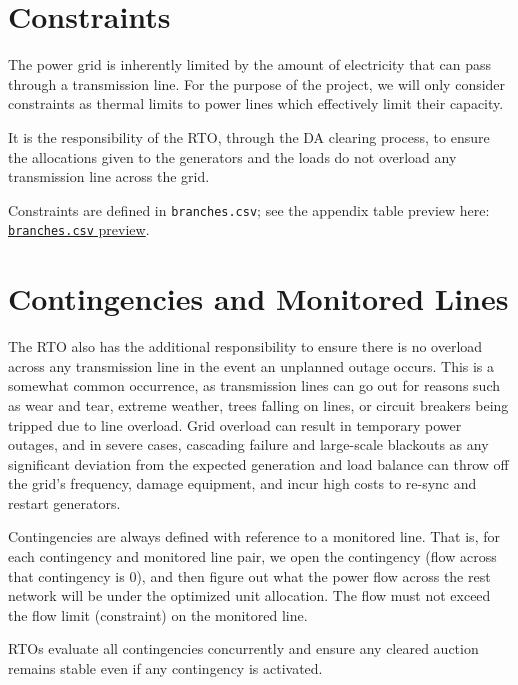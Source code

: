 \documentclass[11pt]{article}
\begin{document}
\section{Constraints}
The power grid is inherently limited by the amount of electricity that can pass through a transmission line. For the purpose of the project, we will only consider constraints as thermal limits to power lines which effectively limit their capacity.

It is the responsibility of the RTO, through the DA clearing process, to ensure the allocations given to the generators and the loads do not overload any transmission line across the grid.

Constraints are defined in \texttt{branches.csv}; see the appendix table preview here: \hyperref[app:branches-preview]{\texttt{branches.csv} preview}.

\section{Contingencies and Monitored Lines}
The RTO also has the additional responsibility to ensure there is no overload across any transmission line in the event an unplanned outage occurs. This is a somewhat common occurrence, as transmission lines can go out for reasons such as wear and tear, extreme weather, trees falling on lines, or circuit breakers being tripped due to line overload. Grid overload can result in temporary power outages, and in severe cases, cascading failure and large-scale blackouts as any significant deviation from the expected generation and load balance can throw off the grid's frequency, damage equipment, and incur high costs to re-sync and restart generators.

Contingencies are always defined with reference to a monitored line. That is, for each contingency and monitored line pair, we open the contingency (flow across that contingency is 0), and then figure out what the power flow across the rest network will be under the optimized unit allocation. The flow must not exceed the flow limit (constraint) on the monitored line.




RTOs evaluate all contingencies concurrently and ensure any cleared auction remains stable even if any contingency is activated.
\end{document}
